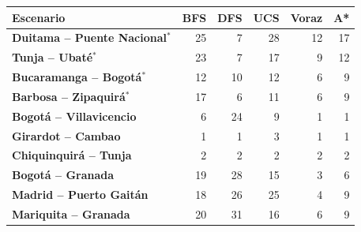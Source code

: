 \renewcommand{\arraystretch}{1.2}
\begin{tabular}{|l|r|r|r|r|r|}
\hline
\rowcolor{gray!20} \textbf{Escenario} & \textbf{BFS} & \textbf{DFS} & \textbf{UCS} & \textbf{Voraz} & \textbf{A*} \\
\hline
\textbf{Duitama -- Puente Nacional$^{*}$} & 25 & 7 & 28 & 12 & 17 \\
\hline
\textbf{Tunja -- Ubaté$^{*}$} & 23 & 7 & 17 & 9 & 12 \\
\hline
\textbf{Bucaramanga -- Bogotá$^{*}$} & 12 & 10 & 12 & 6 & 9 \\
\hline
\textbf{Barbosa -- Zipaquirá$^{*}$} & 17 & 6 & 11 & 6 & 9 \\
\hline
\textbf{Bogotá -- Villavicencio} & 6 & 24 & 9 & 1 & 1 \\
\hline
\textbf{Girardot -- Cambao} & 1 & 1 & 3 & 1 & 1 \\
\hline
\textbf{Chiquinquirá -- Tunja} & 2 & 2 & 2 & 2 & 2 \\
\hline
\textbf{Bogotá -- Granada} & 19 & 28 & 15 & 3 & 6 \\
\hline
\textbf{Madrid -- Puerto Gaitán} & 18 & 26 & 25 & 4 & 9 \\
\hline
\textbf{Mariquita -- Granada} & 20 & 31 & 16 & 6 & 9 \\
\hline
\end{tabular}
